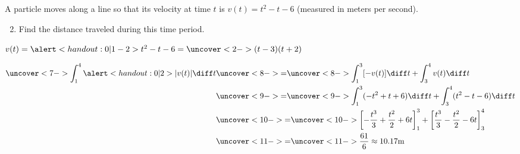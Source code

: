 \begin{frame}[t]
\begin{example} %
A particle moves along a line so that its velocity at time $t$ is \alert<handout:0| 2>{$v(t) = t^2 - t - 6$} (measured in meters per second).
\begin{enumerate}
\setcounter{enumi}{1}
\item  Find the distance traveled during this time period.
\end{enumerate}
$v(t) = \alert<handout:0| 1-2>{t^2 - t - 6 = \uncover<2->{(t-3)(t+2)}}$ %
%

%
\abovedisplayskip=0pt
\belowdisplayskip=0pt
\begin{align*}
\uncover<7->{ \int_1^4 \alert<handout:0| 2>{|v(t)|} \diff t }%
& \uncover<8->{=}  \uncover<8->{ \int_1^3 [-v(t)]\diff t + \int_3^4 v(t) \diff t}\\%
& \uncover<9->{=}  \uncover<9->{ \int_1^3 (-t^2 + t + 6 )\diff t + \int_3^4 (t^2 - t - 6) \diff t}\\%
& \uncover<10->{=}  \uncover<10->{ \left[ -\frac{t^3}{3} + \frac{t^2}{2} + 6t\right]_1^3 + \left[ \frac{t^3}{3} - \frac{t^2}{2} - 6t\right]_3^4}\\%
& \uncover<11->{=}  \uncover<11->{ \frac{61}{6} \approx 10.17\text{m}} 
\end{align*}
\end{example}
\end{frame}
